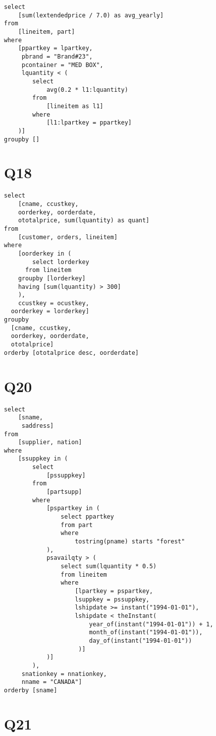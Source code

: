 \begin{lstlisting}
select
	[sum(lextendedprice / 7.0) as avg_yearly]		
from
	[lineitem, part]
where
	[ppartkey = lpartkey,
	 pbrand = "Brand#23",
	 pcontainer = "MED BOX",
	 lquantity < (
		select
			avg(0.2 * l1:lquantity)
		from
			[lineitem as l1]
		where
			[l1:lpartkey = ppartkey]
	)]
groupby	[]
\end{lstlisting}

\clearpage

\section*{Q18}
\label{sec:Q18}

\begin{lstlisting}
select
	[cname, ccustkey,
	oorderkey, oorderdate,
	ototalprice, sum(lquantity) as quant]
from
	[customer, orders, lineitem]
where
	[oorderkey in (
		select lorderkey
	  from lineitem
    groupby [lorderkey] 
    having [sum(lquantity) > 300] 
	),
	ccustkey = ocustkey,
  oorderkey = lorderkey]
groupby
  [cname, ccustkey,
  oorderkey, oorderdate,
  ototalprice]
orderby [ototalprice desc, oorderdate]
\end{lstlisting}

\clearpage

\section*{Q20}
\label{sec:Q20}

\begin{lstlisting}
select
	[sname,
	 saddress]
from
	[supplier, nation]
where
	[ssuppkey in (
		select
			[pssuppkey]
		from
			[partsupp]
		where
			[pspartkey in (
				select ppartkey
				from part
				where
					tostring(pname) starts "forest"
			),
			psavailqty > (
				select sum(lquantity * 0.5)
				from lineitem
				where
					[lpartkey = pspartkey,
					lsuppkey = pssuppkey,
					lshipdate >= instant("1994-01-01"),
					lshipdate < theInstant(
						year_of(instant("1994-01-01")) + 1, 
					 	month_of(instant("1994-01-01")), 
					 	day_of(instant("1994-01-01"))
					 )]
			)]
		),
	 snationkey = nnationkey,
	 nname = "CANADA"]
orderby	[sname]
\end{lstlisting}

\clearpage

\section*{Q21}
\label{sec:Q21}

